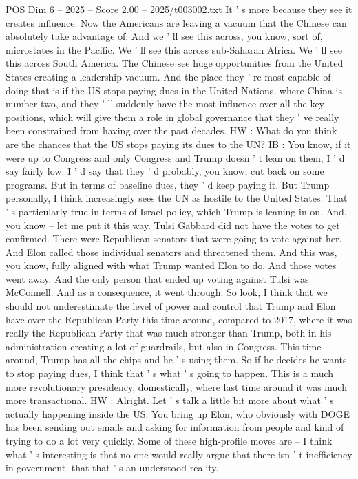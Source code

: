 \begin{textsample}{POS Dim 6 – 2025 – Score 2.00 – 2025/t003002.txt}
It ' s more because they see it creates influence.
Now the Americans are leaving a vacuum that the Chinese can absolutely take advantage of.
And we ' ll see this across, you know, sort of, microstates in the Pacific.
We ' ll see this across sub-Saharan Africa.
We ' ll see this across South America.
The Chinese see huge opportunities from the United States creating a leadership vacuum.
And the place they ' re most capable of doing that is if the US stops paying dues in the United Nations, where China is number two, and they ' ll suddenly have the most influence over all the key positions, which will give them a role in global governance that they ' ve really been constrained from having over the past decades.
HW : What do you think are the chances that the US stops paying its dues to the UN?
IB : You know, if it were up to Congress and only Congress and Trump doesn ' t lean on them, I ' d say fairly low.
I ' d say that they ' d probably, you know, cut back on some programs.
But in terms of baseline dues, they ' d keep paying it.
But Trump personally, I think increasingly sees the UN as hostile to the United States.
That ' s particularly true in terms of Israel policy, which Trump is leaning in on.
And, you know -- let me put it this way.
Tulsi Gabbard did not have the votes to get confirmed.
There were Republican senators that were going to vote against her.
And Elon called those individual senators and threatened them.
And this was, you know, fully aligned with what Trump wanted Elon to do.
And those votes went away.
And the only person that ended up voting against Tulsi was McConnell.
And as a consequence, it went through.
So look, I think that we should not underestimate the level of power and control that Trump and Elon have over the Republican Party this time around, compared to 2017, where it was really the Republican Party that was much stronger than Trump, both in his administration creating a lot of guardrails, but also in Congress.
This time around, Trump has all the chips and he ' s using them.
So if he decides he wants to stop paying dues, I think that ' s what ' s going to happen.
This is a much more revolutionary presidency, domestically, where last time around it was much more transactional.
HW : Alright.
Let ' s talk a little bit more about what ' s actually happening inside the US.
You bring up Elon, who obviously with DOGE has been sending out emails and asking for information from people and kind of trying to do a lot very quickly.
Some of these high-profile moves are -- I think what ' s interesting is that no one would really argue that there isn ' t inefficiency in government, that that ' s an understood reality.

\end{textsample}
